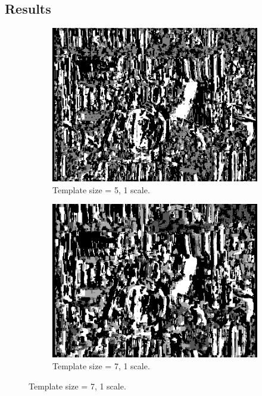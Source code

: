 \documentclass[12pt,a4paper,oneside,final]{article}
\begin{document}
	\subsection{Results}
	\begin{figure}[H]
		\centering
		\begin{subfigure}[b]{0.24\textwidth}
			\includegraphics[width=\textwidth]{disparity_s1_k5set_1.png}
			\caption{Template size = 5, 1 scale.}
		\end{subfigure}
		\begin{subfigure}[b]{0.24\textwidth}
			\includegraphics[width=\textwidth]{disparity_s1_k7set_1.png}
			\caption{Template size = 7, 1 scale.}
		\end{subfigure}

\end{figure}
\end{document}
